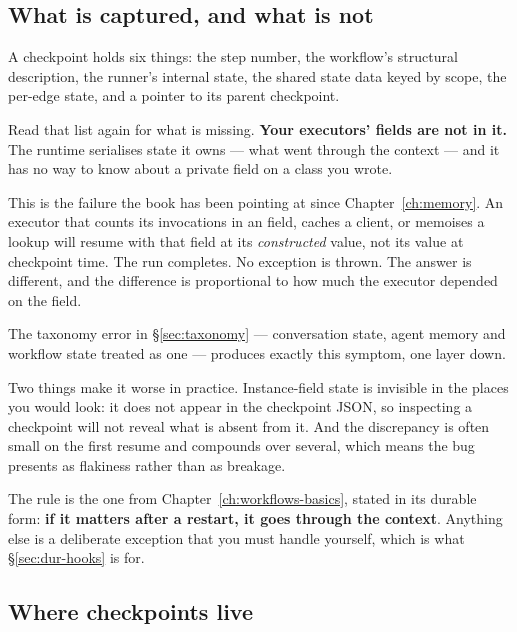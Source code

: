 \subsection{What is captured, and what is not}
\label{sec:dur-captured}

A checkpoint holds six things: the step number, the workflow's structural
description, the runner's internal state, the shared state data keyed by scope,
the per-edge state, and a pointer to its parent checkpoint.

Read that list again for what is missing. \textbf{Your executors' fields are not
in it.} The runtime serialises state it owns --- what went through the context
--- and it has no way to know about a private field on a class you wrote.

\begin{warning}
This is the failure the book has been pointing at since Chapter~\ref{ch:memory}.
An executor that counts its invocations in an  field, caches a client,
or memoises a lookup will resume with that field at its \emph{constructed} value,
not its value at checkpoint time. The run completes. No exception is thrown. The
answer is different, and the difference is proportional to how much the executor
depended on the field.

The taxonomy error in \S\ref{sec:taxonomy} --- conversation state, agent memory
and workflow state treated as one --- produces exactly this symptom, one layer
down.
\end{warning}

Two things make it worse in practice. Instance-field state is invisible in the
places you would look: it does not appear in the checkpoint JSON, so inspecting a
checkpoint will not reveal what is absent from it. And the discrepancy is often
small on the first resume and compounds over several, which means the bug
presents as flakiness rather than as breakage.

The rule is the one from Chapter~\ref{ch:workflows-basics}, stated in its
durable form: \textbf{if it matters after a restart, it goes through the
context}. Anything else is a deliberate exception that you must handle yourself,
which is what \S\ref{sec:dur-hooks} is for.

\subsection{Where checkpoints live}
\label{sec:dur-stores}

